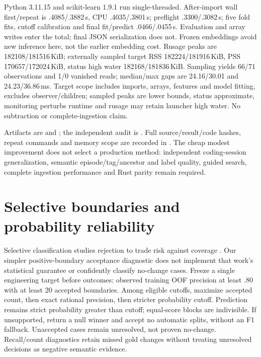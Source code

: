 \documentclass[11pt]{article}
\begin{document}
Python 3.11.15 and scikit-learn 1.9.1 run single-threaded. After-import wall
first/repeat is .4085/.3882\,s, CPU .4035/.3801\,s; preflight .3300/.3082\,s;
five fold fits, cutoff calibration and final fit/predict .0466/.0455\,s.
Evaluation and array writes enter the total; final JSON serialization does not.
Frozen embeddings avoid new inference here, not the earlier embedding cost.
Rusage peaks are 182108/181516\,KiB; externally sampled target RSS
182224/181916\,KiB, PSS 170657/172024\,KiB, status high water
182168/181836\,KiB. Sampling yields 66/71 observations and 1/0 vanished reads;
median/max gaps are 24.16/30.01 and 24.23/36.86\,ms. Target scope includes imports,
arrays, features and model fitting, excludes observer/children; sampled peaks
are lower bounds, status approximate, monitoring perturbs runtime and rusage
may retain launcher high water. No subtraction or complete-ingestion claim.

Artifacts are  and
; the independent audit is
. Full source/result/code hashes,
repeat commands and memory scope are recorded in
. The cheap modest
improvement does not select a production method: independent coding-session
generalization, semantic episode/tag/ancestor and label quality, guided search,
complete ingestion performance and Rust parity remain required.

\section{Selective boundaries and probability reliability}
Selective classification studies rejection to trade risk against coverage
\cite{geifman2017selective}. Our simpler positive-boundary acceptance diagnostic
does not implement that work's statistical guarantee or confidently classify
no-change cases. Freeze a single engineering target before outcomes: observed
training OOF precision at least .80 with at least 20 accepted boundaries. Among
eligible cutoffs, maximize accepted count, then exact rational precision, then
stricter probability cutoff. Prediction remains strict probability greater than
cutoff; equal-score blocks are indivisible. If unsupported, return a null winner
and accept no automatic splits, without an F1 fallback. Unaccepted cases remain
unresolved, not proven no-change. Recall/count diagnostics retain missed gold
changes without treating unresolved decisions as negative semantic evidence.
\end{document}

